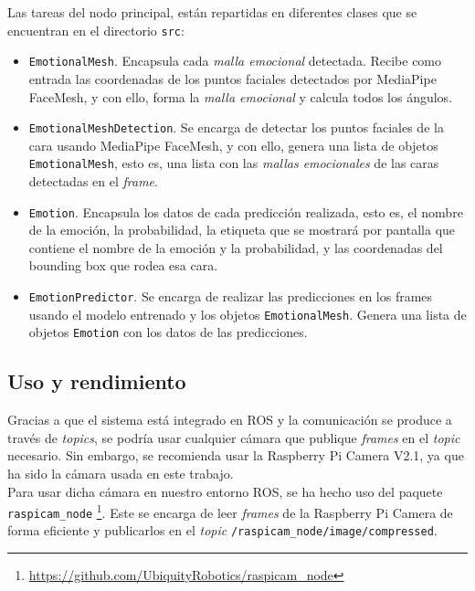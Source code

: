 Las tareas del nodo principal, están repartidas en diferentes clases que se encuentran en el directorio \verb|src|:

\begin{itemize}
    \item \verb|EmotionalMesh|. Encapsula cada \textit{malla emocional} detectada. Recibe como entrada las coordenadas de los puntos faciales detectados por MediaPipe FaceMesh, y con ello, forma la \textit{malla emocional} y calcula todos los ángulos.
    
    \item \verb|EmotionalMeshDetection|. Se encarga de detectar los puntos faciales de la cara usando MediaPipe FaceMesh, y con ello, genera una lista de objetos \verb|EmotionalMesh|, esto es, una lista con las \textit{mallas emocionales} de las caras detectadas en el \textit{frame}.
    
    \item \verb|Emotion|. Encapsula los datos de cada predicción realizada, esto es, el nombre de la emoción, la probabilidad, la etiqueta que se mostrará por pantalla que contiene el nombre de la emoción y la probabilidad, y las coordenadas del bounding box que rodea esa cara.
    
    \item \verb|EmotionPredictor|. Se encarga de realizar las predicciones en los frames usando el modelo entrenado y los objetos \verb|EmotionalMesh|. Genera una lista de objetos \verb|Emotion| con los datos de las predicciones.
\end{itemize}

\subsection{Uso y rendimiento}

Gracias a que el sistema está integrado en ROS y la comunicación se produce a través de \textit{topics}, se podría usar cualquier cámara que publique \textit{frames} en el \textit{topic} necesario. Sin embargo, se recomienda usar la Raspberry Pi Camera V2.1, ya que ha sido la cámara usada en este trabajo.\\

Para usar dicha cámara en nuestro entorno ROS, se ha hecho uso del paquete \verb|raspicam_node| \footnote{\url{https://github.com/UbiquityRobotics/raspicam_node}}. Este se encarga de leer \textit{frames} de la Raspberry Pi Camera de forma eficiente y publicarlos en el \textit{topic} \verb|/raspicam_node/image/compressed|.\\


